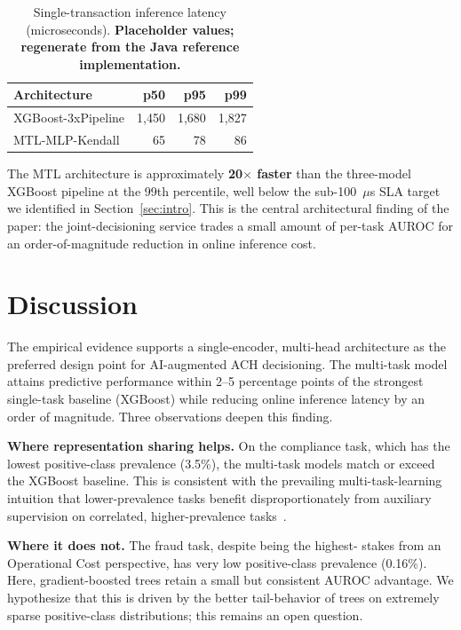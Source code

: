 \documentclass[11pt,a4paper]{article}
\begin{document}
\begin{table}[h]
\centering
\caption{Single-transaction inference latency (microseconds).
\textbf{Placeholder values; regenerate from the Java reference implementation.}}
\label{tab:latency}
\begin{tabular}{lrrr}
\toprule
\textbf{Architecture} & \textbf{p50} & \textbf{p95} & \textbf{p99} \\
\midrule
XGBoost-3xPipeline & 1{,}450 & 1{,}680 & 1{,}827 \\
MTL-MLP-Kendall    &     65  &     78  &     86  \\
\bottomrule
\end{tabular}
\end{table}

The MTL architecture is approximately \textbf{20$\times$ faster} than the
three-model XGBoost pipeline at the 99th percentile, well below the
sub-100~$\mu$s SLA target we identified in Section~\ref{sec:intro}. This
is the central architectural finding of the paper: the joint-decisioning
service trades a small amount of per-task AUROC for an order-of-magnitude
reduction in online inference cost.

\section{Discussion}
\label{sec:disc}

The empirical evidence supports a single-encoder, multi-head architecture
as the preferred design point for AI-augmented ACH decisioning. The
multi-task model attains predictive performance within 2--5 percentage
points of the strongest single-task baseline (XGBoost) while reducing
online inference latency by an order of magnitude. Three observations
deepen this finding.

\textbf{Where representation sharing helps.} On the compliance task,
which has the lowest positive-class prevalence (3.5\%), the multi-task
models match or exceed the XGBoost baseline. This is consistent with
the prevailing multi-task-learning intuition that lower-prevalence
tasks benefit disproportionately from auxiliary supervision on
correlated, higher-prevalence tasks~\cite{caruana1997}.

\textbf{Where it does not.} The fraud task, despite being the highest-
stakes from an Operational Cost perspective, has very low positive-class
prevalence (0.16\%). Here, gradient-boosted trees retain a small but
consistent AUROC advantage. We hypothesize that this is driven by the
better tail-behavior of trees on extremely sparse positive-class
distributions; this remains an open question.
\end{document}
